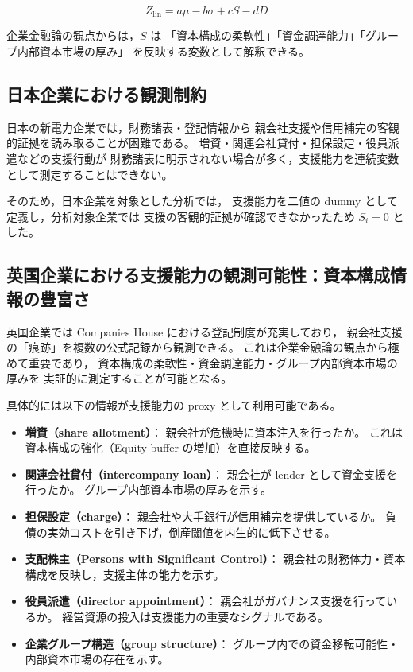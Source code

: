 \[
Z_{\text{lin}} = a\mu - b\sigma + cS - dD
\]



企業金融論の観点からは，$S$ は
「資本構成の柔軟性」「資金調達能力」「グループ内部資本市場の厚み」
を反映する変数として解釈できる。

\subsection{日本企業における観測制約}

日本の新電力企業では，財務諸表・登記情報から
親会社支援や信用補完の客観的証拠を読み取ることが困難である。
増資・関連会社貸付・担保設定・役員派遣などの支援行動が
財務諸表に明示されない場合が多く，支援能力を連続変数として測定することはできない。

そのため，日本企業を対象とした分析では，
支援能力を二値の dummy として定義し，分析対象企業では
支援の客観的証拠が確認できなかったため $S_i = 0$ とした。

\subsection{英国企業における支援能力の観測可能性：資本構成情報の豊富さ}

英国企業では Companies House における登記制度が充実しており，
親会社支援の「痕跡」を複数の公式記録から観測できる。
これは企業金融論の観点から極めて重要であり，
資本構成の柔軟性・資金調達能力・グループ内部資本市場の厚みを
実証的に測定することが可能となる。

具体的には以下の情報が支援能力の proxy として利用可能である。

\begin{itemize}
    \item \textbf{増資（share allotment）}：
          親会社が危機時に資本注入を行ったか。  
          これは資本構成の強化（Equity buffer の増加）を直接反映する。
    \item \textbf{関連会社貸付（intercompany loan）}：
          親会社が lender として資金支援を行ったか。  
          グループ内部資本市場の厚みを示す。
    \item \textbf{担保設定（charge）}：
          親会社や大手銀行が信用補完を提供しているか。  
          負債の実効コストを引き下げ，倒産閾値を内生的に低下させる。
    \item \textbf{支配株主（Persons with Significant Control）}：
          親会社の財務体力・資本構成を反映し，支援主体の能力を示す。
    \item \textbf{役員派遣（director appointment）}：
          親会社がガバナンス支援を行っているか。  
          経営資源の投入は支援能力の重要なシグナルである。
    \item \textbf{企業グループ構造（group structure）}：
          グループ内での資金移転可能性・内部資本市場の存在を示す。
\end{itemize}

